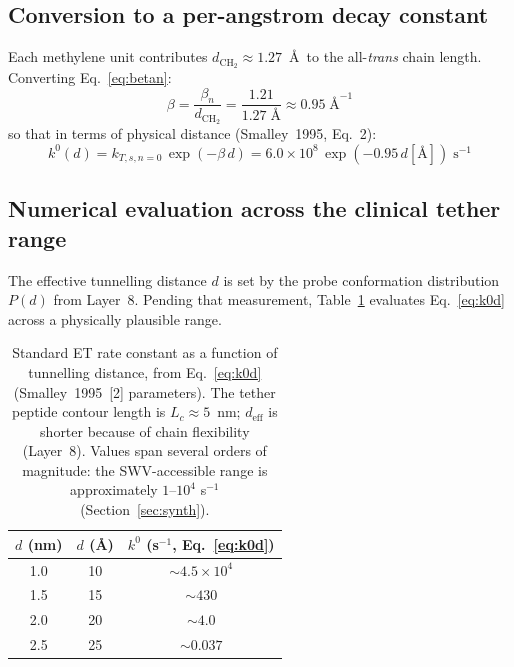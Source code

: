\documentclass[10pt,a4paper]{article}
\numberwithin{equation}{section}
\newcommand{\cit}[1]{[#1]}
\begin{document}
\subsection{Conversion to a per-angstrom decay constant}

Each methylene unit contributes $d_{\text{CH}_2} \approx 1.27$~\AA\
to the all-\textit{trans} chain length. Converting Eq.~\eqref{eq:betan}:
\begin{equation}
  \beta = \frac{\beta_n}{d_{\text{CH}_2}}
  = \frac{1.21}{1.27\;\text{\AA}}
  \approx 0.95\;\text{\AA}^{-1}
  \label{eq:betaA}
\end{equation}
so that in terms of physical distance (Smalley~1995, Eq.~2):
\begin{equation}
  k^0(d) = k_{T,s,n=0}\,\exp(-\beta\,d)
  = 6.0 \times 10^8\,\exp(-0.95\,d[\text{\AA}])\;\text{s}^{-1}
  \label{eq:k0d}
\end{equation}

\subsection{Numerical evaluation across the clinical tether range}

The effective tunnelling distance $d$ is set by the probe
conformation distribution $P(d)$ from Layer~8. Pending that
measurement, Table~\ref{tab:k0d} evaluates Eq.~\eqref{eq:k0d}
across a physically plausible range.

\begin{table}[H]
\centering
\small\renewcommand{\arraystretch}{1.3}
\begin{tabular}{@{}ccc@{}}
\toprule
$d$ (nm) & $d$ (\AA) & $k^0$ (s$^{-1}$, Eq.~\ref{eq:k0d}) \\
\midrule
1.0 & 10 & $\sim 4.5 \times 10^4$ \\
1.5 & 15 & $\sim 430$ \\
2.0 & 20 & $\sim 4.0$ \\
2.5 & 25 & $\sim 0.037$ \\
\bottomrule
\end{tabular}
\caption{Standard ET rate constant as a function of tunnelling
distance, from Eq.~\eqref{eq:k0d} (Smalley~1995~\cit{2} parameters).
The tether peptide contour length is $L_c \approx 5$~nm; $d_{\text{eff}}$
is shorter because of chain flexibility (Layer~8). Values span
several orders of magnitude: the SWV-accessible range is
approximately $1$--$10^4$ s$^{-1}$ (Section~\ref{sec:synth}).}
\label{tab:k0d}
\end{table}
\end{document}
